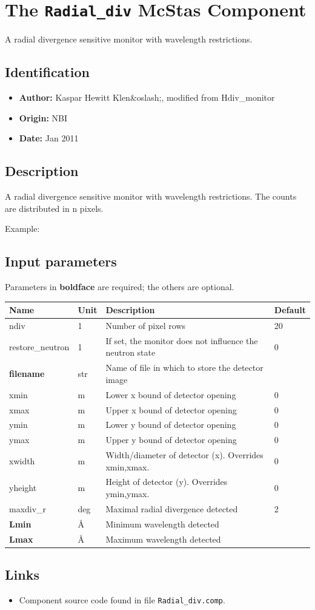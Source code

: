 \section{The \texttt{Radial\_div} McStas Component}
A radial divergence sensitive monitor with wavelength restrictions.

\subsection*{Identification}
\begin{itemize}
  \item \textbf{Author:} Kaspar Hewitt Klen\&oslash;, modified from Hdiv\_monitor
  \item \textbf{Origin:} NBI
  \item \textbf{Date:} Jan 2011
\end{itemize}

\subsection*{Description}
A radial divergence sensitive monitor with wavelength restrictions. The counts are distributed in n pixels.

Example:

\subsection*{Input parameters}
Parameters in \textbf{boldface} are required; the others are optional.

\begin{longtable}{p{}p{}p{}p{}}
\toprule
\textbf{Name} & \textbf{Unit} & \textbf{Description} & \textbf{Default} \\
\midrule
\endhead
ndiv & 1 & Number of pixel rows & 20 \\
restore\_neutron & 1 & If set, the monitor does not influence the neutron state & 0 \\
\textbf{filename} & str & Name of file in which to store the detector image &  \\
xmin & m & Lower x bound of detector opening & 0 \\
xmax & m & Upper x bound of detector opening & 0 \\
ymin & m & Lower y bound of detector opening & 0 \\
ymax & m & Upper y bound of detector opening & 0 \\
xwidth & m & Width/diameter of detector (x). Overrides xmin,xmax. & 0 \\
yheight & m & Height of detector (y). Overrides ymin,ymax. & 0 \\
maxdiv\_r & deg & Maximal radial divergence detected & 2 \\
\textbf{Lmin} & \AA{} & Minimum wavelength detected &  \\
\textbf{Lmax} & \AA{} & Maximum wavelength detected &  \\
\bottomrule
\end{longtable}

\subsection*{Links}
\begin{itemize}
  \item Component source code found in file \texttt{Radial\_div.comp}.
\end{itemize}
